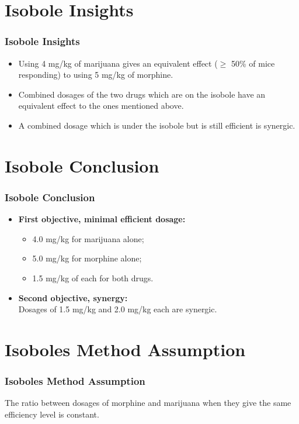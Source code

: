 \documentclass[14pt]{beamer}
\begin{document}
\section{Isobole Insights}
\begin{frame}
\frametitle{Isobole Insights}
\begin{itemize}[label={$\blacktriangleright$}]
\item Using 4 mg/kg of marijuana gives an equivalent effect ($\geq$ 50\% of mice responding) to using 5 mg/kg of morphine.
\item Combined dosages of the two drugs which are on the isobole have an equivalent effect to the ones mentioned above.
\item A combined dosage which is under the isobole but is still efficient is synergic.
\end{itemize}
\end{frame}

\section{Isobole Conclusion}
\begin{frame}
\frametitle{Isobole Conclusion}
\begin{itemize}[label={\checkmark}]
\item \textbf{First objective, minimal efficient dosage:} \\
\begin{itemize}[label={$\blacktriangleright$}]
\item 4.0 mg/kg for marijuana alone;
\item 5.0 mg/kg for morphine alone;
\item 1.5 mg/kg of each for both drugs.
\end{itemize}
\item \textbf{Second objective, synergy:} \\
Dosages of 1.5 mg/kg and 2.0 mg/kg each are synergic.
\end{itemize}
\end{frame}

\section{Isoboles Method Assumption}
\begin{frame}
\frametitle{Isoboles Method Assumption}
The ratio between dosages of morphine and marijuana when they give the same efficiency level is constant.
\end{frame}
\end{document}
